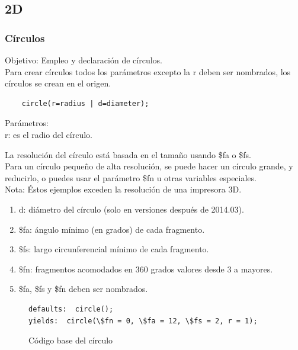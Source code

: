 \documentclass{article}
\begin{document}
\subsection{2D}

\subsubsection{Círculos}

Objetivo: Empleo y declaración de círculos.\citep{OpenSCS}\\

Para crear círculos todos los parámetros excepto la r deben ser nombrados, los círculos se crean en el origen.\citep{WikiOpensCADLanguage}\\

\begin{verbatim}
    circle(r=radius | d=diameter);
\end{verbatim}

Parámetros:\\

r: es el radio del círculo.

La resolución del círculo está basada en el tamaño usando  \$fa o \$fs.\\

Para un círculo pequeño de alta resolución, se puede hacer un círculo grande, y reducirlo, o puedes usar el parámetro \$fn u otras variables especiales.\citep{WikiOpensCADLanguage}\\

Nota: Éstos ejemplos exceden la resolución de una impresora 3D.\citep{WikiOpensCADLanguage}\\


\begin{enumerate}
\item d: diámetro del círculo (solo en versiones después de 2014.03).
\item \$fa: ángulo mínimo (en grados) de cada fragmento.
\item \$fs: largo circunferencial mínimo de cada fragmento.
\item \$fn: fragmentos acomodados en 360 grados valores desde 3 a mayores.
\item \$fa, \$fs y \$fn deben ser nombrados.
\end{enumerate}

\begin{figure}[h!]
    \centering
   \begin{verbatim}
defaults:  circle(); 
yields:  circle(\$fn = 0, \$fa = 12, \$fs = 2, r = 1);
\end{verbatim}
    \caption{Código base del círculo}
    \label{fig:codCirculo}
\end{figure}
\end{document}

